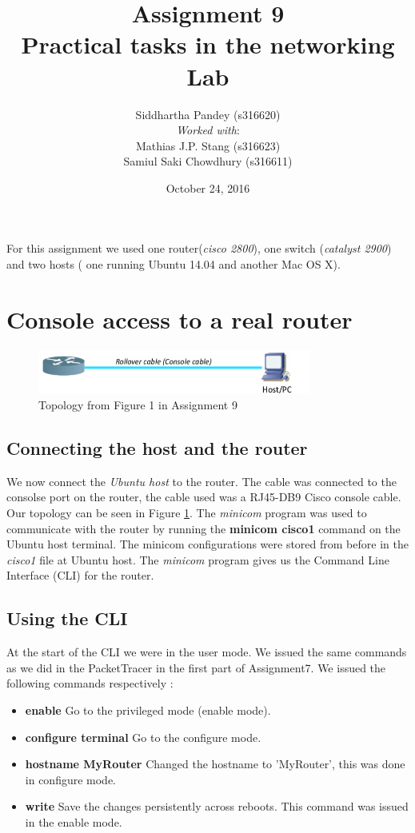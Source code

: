 \documentclass{article}
\date{October 24, 2016}
\title{\textbf{Assignment 9}\\Practical tasks in the networking Lab}
\author{Siddhartha Pandey (s316620)\\
\textit{Worked with}:\\ Mathias J.P. Stang (s316623)\\
Samiul Saki Chowdhury (s316611)
}
\begin{document}
\maketitle
\newpage
\tableofcontents
\newpage



For this assignment we used one router(\textit{cisco 2800}), one switch (\textit{catalyst 2900}) and two hosts ( one running Ubuntu 14.04 and another Mac OS X).

\section{Console access to a real router}

\begin{figure}[h]
    \centering
    \includegraphics[width=0.8\textwidth]{1topo}
    \caption{Topology from Figure 1 in Assignment 9}
    \label{fig:1topo}
\end{figure}

\subsection{Connecting the host and the router}
We now connect the \textit{Ubuntu host} to the router. The cable was connected to the consolse port on the router, the cable used was a RJ45-DB9 Cisco console cable. Our topology can be seen in Figure \ref{fig:1topo}. The \textit{minicom} program was used to communicate with the router by running the \textbf{minicom cisco1} command on the Ubuntu host terminal. The minicom configurations were stored from before in the \textit{cisco1} file at Ubuntu host.  The \textit{minicom} program gives us the Command Line Interface (CLI) for the router. 

\subsection{Using the CLI}
At the start of the CLI we were in the user mode. We issued the same commands as we did in the PacketTracer in the first part of Assignment7. We issued the following commands respectively : 
\begin{itemize}
    \item \textbf{enable} Go to the privileged mode (enable mode).
    \item \textbf{configure terminal} Go to the configure mode.
    \item \textbf{hostname MyRouter} Changed the hostname to 'MyRouter', this was done in configure mode. 
    \item \textbf{write} Save the changes persistently across reboots. This command was issued in the enable mode. 
\end{itemize}
\end{document}
